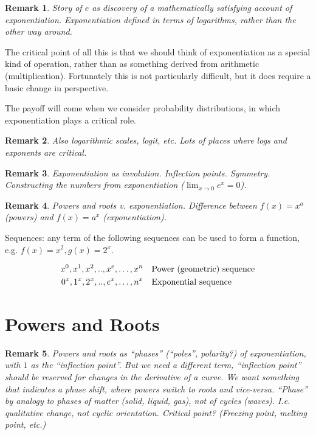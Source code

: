 \documentclass[reqno,12pt]{tufte-book}
\numberwithin{equation}{subsection}
\newtheorem{remark}{Remark}
\begin{document}
\begin{remark}
  Story of $e$ as discovery of a mathematically satisfying account of
  exponentiation.  Exponentiation defined in terms of logarithms,
  rather than the other way around.
\end{remark}

The critical point of all this is that we should think of
exponentiation as a special kind of operation, rather than as
something derived from arithmetic (multiplication).  Fortunately this
is not particularly difficult, but it does require a basic change in
perspective.

The payoff will come when we consider probability distributions, in
which exponentiation plays a critical role.

\begin{remark}
  Also logarithmic scales, logit, etc.  Lots of places where logs and
  exponents are critical.
\end{remark}

\begin{remark}
  Exponentiation as involution.  Inflection points.  Symmetry.
  Constructing the numbers from exponentiation ($\lim_{x \to 0}e^x =
  0$).
\end{remark}

\begin{remark}
  Powers and roots v. exponentiation.  Difference between ${f(x) =
    x^a}$ (powers) and ${f(x)= a^x}$ (exponentiation).
\end{remark}

Sequences: any term of the following sequences can be used to form a
function, e.g. $f(x) = x^2, g(x) = 2^x$.

{
  \begin{alignat}{2}
    x^0, x^1, x^2,..,x^e,\ldots,x^n & \quad \textnormal{Power (geometric) sequence} \\
    0^x, 1^x, 2^x,..,e^x,\ldots,n^x & \quad \textnormal{Exponential sequence}
  \end{alignat}
}

\section{Powers and Roots}

\begin{remark}
  Powers and roots as ``phases'' (``poles'', polarity?) of
  exponentiation, with $1$ as the ``inflection point''.  But we need a
  different term, ``inflection point'' should be reserved for changes
  in the derivative of a curve.  We want something that indicates a
  phase shift, where powers switch to roots and vice-versa.  ``Phase''
  by analogy to phases of matter (solid, liquid, gas), not of cycles
  (waves).  I.e. qualitative change, not cyclic orientation.  Critical
  point? (Freezing point, melting point, etc.)
\end{remark}
\end{document}
